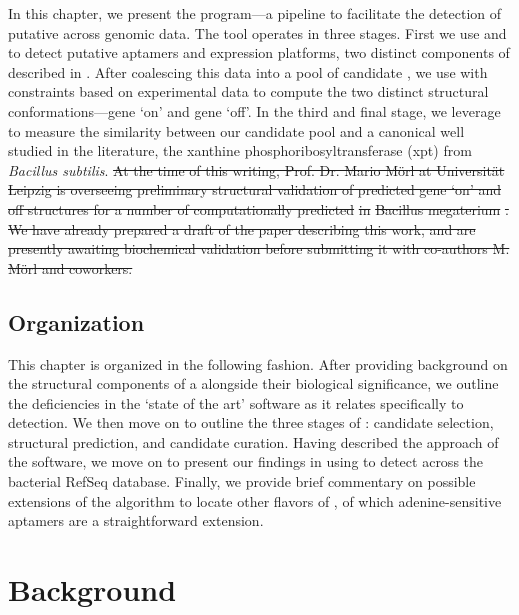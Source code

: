 \documentclass[11pt, oneside]{Thesis} %
\providecommand{\DIFdel}[1]{{\protect\color{red}\sout{#1}}}                      %
\providecommand{\DIFdelbegin}{} %
\providecommand{\DIFdelend}{} %
\begin{document}
In this chapter, we present the \rfinder program---a pipeline to facilitate the
detection of putative \grbs across genomic data. The \rfinder
tool operates in three stages. First we use \infernal
\citep{infernal,nawrocki:2013hk} and \tthp \citep{ermolaeva:2000cl} to detect
putative aptamers and expression platforms, two distinct components of
\rbs described in . After coalescing
this data into a pool of candidate \rbs, we use \rfold \citep{lorenz.amb11}
with constraints based on experimental data to compute the two distinct structural
conformations---gene `on' and gene `off'. In the third and final stage, we
leverage \foldalign \citep{gorodkin:1997tr,havgaard:2007ca} to measure the similarity between our
candidate pool and a
canonical \grb well studied in the literature, the
xanthine phosphoribosyltransferase (xpt) \grb from {\em Bacillus subtilis}.
\DIFdelbegin \DIFdel{At the
time of this writing, Prof. Dr. Mario
M\"orl at Universit\"at Leipzig is overseeing preliminary structural
validation of predicted gene `on' and off structures for a number of
computationally predicted }%
\DIFdel{in }%
\DIFdel{Bacillus megaterium}%
\DIFdel{. We have already
prepared a draft of the paper describing this work, and are presently awaiting
biochemical validation before submitting it with co-authors M. M\"orl and
coworkers.
}\DIFdelend 

\subsection{Organization}
\label{subsec:rfinder:org}

This chapter is organized in the following fashion. After providing background
on the structural components of a \rb alongside their biological
significance, we outline the deficiencies in the `state of the art' software
as it relates specifically to \rb detection. We then move on to outline
the three stages of \rfinder: candidate selection, structural prediction, and
candidate curation. Having described the approach of the software, we move on
to present our findings in using \rfinder to detect \grbs across
the bacterial RefSeq database. Finally, we provide brief commentary on possible
extensions of the algorithm to locate other flavors of \rbs, of which
adenine-sensitive aptamers are a straightforward extension.

\section{Background}
\label{sec:rfinder:bkgrnd}
\end{document}
